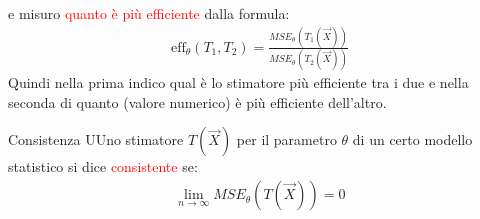 \documentclass{article}  %
\theoremstyle{definition}
\begin{document}
e misuro \textcolor{red}{quanto è più efficiente} dalla formula:
\begin{align*}
	\text{eff}_{\theta}(T_1,T_2) = \frac{MSE_{\theta}(T_1(\vec{X}))}{MSE_{\theta}(T_2(\vec{X}))}
\end{align*}
Quindi nella prima indico qual è lo stimatore più efficiente tra i due e nella seconda di quanto (valore numerico) è più efficiente dell'altro.
\begin{theorem}{Consistenza}
	UUno stimatore $T(\vec{X})$ per il parametro $\theta$ di un certo modello statistico si dice \textcolor{red}{consistente} se:
	\begin{align*}
		\lim_{n \to \infty} MSE_{\theta}(T(\vec{X})) = 0
	\end{align*}
\end{theorem}
\begin{table}[h]
	\centering
\end{table}
\newpage
\end{document}
